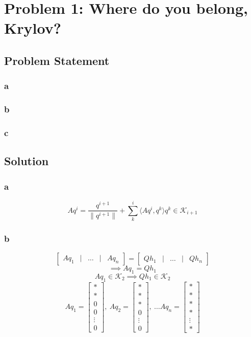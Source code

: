\documentclass[11pt]{report}
\theoremstyle{definition}
\begin{document}
\section*{Problem 1: Where do you belong, Krylov?}
\subsection*{Problem Statement}

\subsubsection*{a}

\subsubsection*{b}

\subsubsection*{c}

\subsection*{Solution}

\subsubsection*{a}

\[
	Aq^i = \frac{q^{i+1}}{\|q^{i+1}\|} + \sum_{k}^{i}\langle Aq^i,q^k\rangle q^k \in \mathcal{K}_{i+1}
\]

\subsubsection*{b}
\[
	\begin{bmatrix}
		Aq_1 & | & \ldots & | & Aq_n
	\end{bmatrix}
	=
	\begin{bmatrix}
		Qh_1 & | & \ldots & | & Qh_n
	\end{bmatrix}
\]
\[\implies Aq_1=Qh_1\]
\[Aq_1\in\mathcal{K}_2\implies Qh_1\in\mathcal{K}_2\]
\[
	Aq_1 = \begin{bmatrix}
		* \\ * \\ 0 \\ 0 \\ \vdots \\ 0
	\end{bmatrix},\
	Aq_2 = \begin{bmatrix}
		* \\ * \\ * \\ 0 \\ \vdots \\ 0
	\end{bmatrix},\ \ldots
	Aq_n = \begin{bmatrix}
		* \\ * \\ * \\ * \\ \vdots \\ *
	\end{bmatrix}
\]
\end{document}
